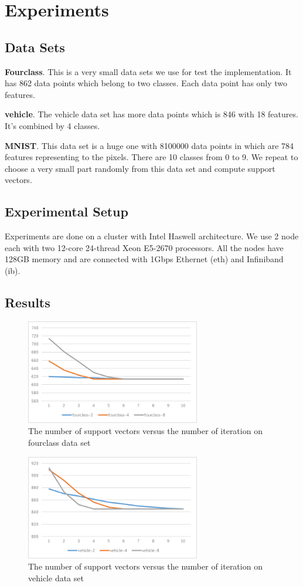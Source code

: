 \section{Experiments}
\subsection{Data Sets}
\textbf{Fourclass}. This is a very small data sets we use for test the implementation. It has 862 data points which belong to two classes. Each data point has only two features.

\textbf{vehicle}. The vehicle data set has more data points which is 846 with 18 features. It's combined by 4 classes.

\textbf{MNIST}. This data set is a huge one with 8100000 data points in which are 784 features representing to the pixels. There are 10 classes from 0 to 9. We repeat to choose a very small part randomly from this data set and compute support vectors.

\subsection{Experimental Setup}
Experiments are done on a cluster with Intel Haswell architecture. We use 2 node each with two 12-core 24-thread Xeon E5-2670 processors. All the nodes have 128GB memory and are connected with 1Gbps Ethernet (eth) and Infiniband (ib).

\subsection{Results}
\begin{figure}[htbp]
\centering
\includegraphics[width=3.0in]{image/SV-fourclass.png}
\caption{The number of support vectors versus the number of iteration on fourclass data set}
\label{SV-fourclass}
\end{figure}

\begin{figure}[htbp]
\centering
\includegraphics[width=3.0in]{image/SV-vehicle.png}
\caption{The number of support vectors versus the number of iteration on vehicle data set}
\label{SV-vehicle}
\end{figure}


